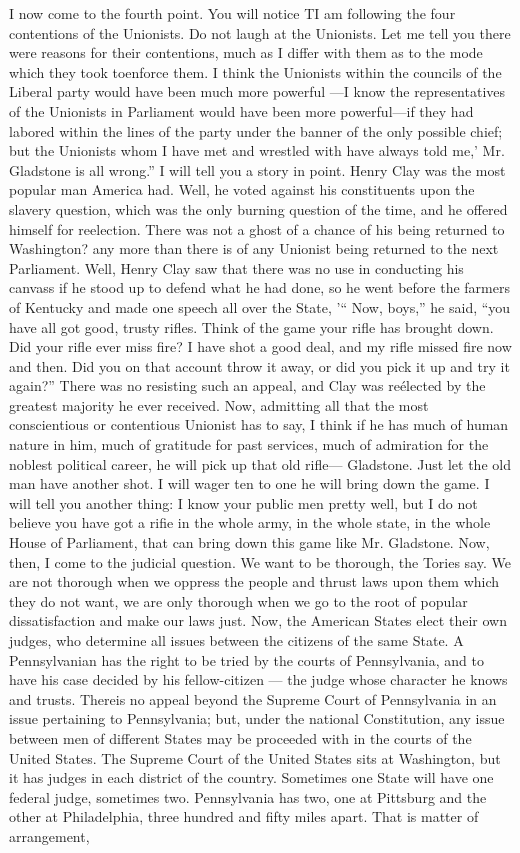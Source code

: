 \documentclass[11pt,openany]{book}
\begin{document}
I now come to the fourth point. You will notice TI am following the four contentions of the Unionists. Do not laugh at the Unionists. Let me tell you there were reasons for their contentions, much as I differ with them as to the mode which they took toenforce them. I think the Unionists within the councils of the Liberal party would have been much more powerful ---I know the representatives of the Unionists in Parliament would have been more powerful---if they had labored within the lines of the party under the banner of the only possible chief; but the Unionists whom I have met and wrestled with have always told me,' Mr. Gladstone is all wrong.'' I will tell you a story in point. Henry Clay was the most popular man America had. Well, he voted against his constituents upon the slavery question, which was the only burning question of the time, and he offered himself for reelection. There was not a ghost of a chance of his being returned to Washington? any more than there is of any Unionist being returned to the next Parliament. Well, Henry Clay saw that there was no use in conducting his canvass if he stood up to defend what he had done, so he went before the farmers of Kentucky and made one speech all over the State, '`` Now, boys,'' he said, ``you have all got good, trusty rifles. Think of the game your rifle has brought down. Did your rifle ever miss fire? I have shot a good deal, and my rifle missed fire now and then. Did you on that account throw it away, or did you pick it up and try it again?'' There was no resisting such an appeal, and Clay was reélected by the greatest majority he ever received. Now, admitting all that the most conscientious or contentious Unionist has to say, I think if he has much of human nature in him, much of gratitude for past services, much of admiration for the noblest political career, he will pick up that old rifle--- Gladstone. Just let the old man have another shot. I will wager ten to one he will bring down the game. I will tell you another thing: I know your public men pretty well, but I do not believe you have got a rifie in the whole army, in the whole state, in the whole House of Parliament, that can bring down this game like Mr. Gladstone. Now, then, I come to the judicial question. We want to be thorough, the Tories say. We are not thorough when we oppress the people and thrust laws upon them which they do not want, we are only thorough when we go to the root of popular dissatisfaction and make our laws just. Now, the American States elect their own judges, who determine all issues between the citizens of the same State. A Pennsylvanian has the right to be tried by the courts of Pennsylvania, and to have his case decided by his fellow-citizen --- the judge whose character he knows and trusts. Thereis no appeal beyond the Supreme Court of Pennsylvania in an issue pertaining to Pennsylvania; but, under the national Constitution, any issue between men of different States may be proceeded with in the courts of the United States. The Supreme Court of the United States sits at Washington, but it has judges in each district of the country. Sometimes one State will have one federal judge, sometimes two. Pennsylvania has two, one at Pittsburg and the other at Philadelphia, three hundred and fifty miles apart. That is matter of arrangement, 
\end{document}

